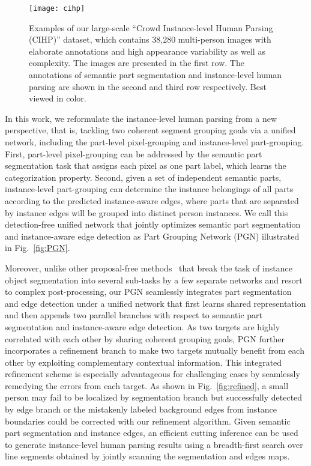\documentclass[runningheads]{llncs}
\begin{document}
\begin{figure*}[t]
\centering
  \texttt{[image: cihp]}
\vspace{-2mm}
\caption{Examples of our large-scale ``Crowd Instance-level Human Parsing (CIHP)'' dataset, which contains 38,280 multi-person images with elaborate annotations and high appearance variability as well as complexity. The images are presented in the first row. The annotations of semantic part segmentation and instance-level human parsing are shown in the second and third row respectively. Best viewed in color.}
\vspace{-6mm}
\label{fig:cihp}
\end{figure*}


In this work, we reformulate the instance-level human parsing from a new perspective, that is, tackling two coherent segment grouping goals via a unified network, including the part-level pixel-grouping and instance-level part-grouping. First, part-level pixel-grouping can be addressed by the semantic part segmentation task that assigns each pixel as one part label, which learns the categorization property. Second, given a set of independent semantic parts, instance-level part-grouping can determine the instance belongings of all parts according to the predicted instance-aware edges, where parts that are separated by instance edges will be grouped into distinct person instances. We call this detection-free unified network that jointly optimizes semantic part segmentation and instance-aware edge detection as Part Grouping Network (PGN) illustrated in Fig.~\ref{fig:PGN}. 

Moreover, unlike other proposal-free methods~\cite{Liu_2017_ICCV,Kirillov_2017_CVPR,liang2015proposal} that break the task of instance object segmentation into several sub-tasks by a few separate networks and resort to complex post-processing, our PGN seamlessly integrates part segmentation and edge detection under a unified network that first learns shared representation and then appends two parallel branches with respect to semantic part segmentation and instance-aware edge detection. As two targets are highly correlated with each other by sharing coherent grouping goals, PGN further incorporates a refinement branch to make two targets mutually benefit from each other by exploiting complementary contextual information. This integrated refinement scheme is especially advantageous for challenging cases by seamlessly remedying the errors from each target. As shown in Fig.~\ref{fig:refined}, a small person may fail to be localized by segmentation branch but successfully detected by edge branch or the mistakenly labeled background edges from instance boundaries could be corrected with our refinement algorithm. Given semantic part segmentation and instance edges, an efficient cutting inference can be used to generate instance-level human parsing results using a breadth-first search over line segments obtained by jointly scanning the segmentation and edges maps.
\end{document}
